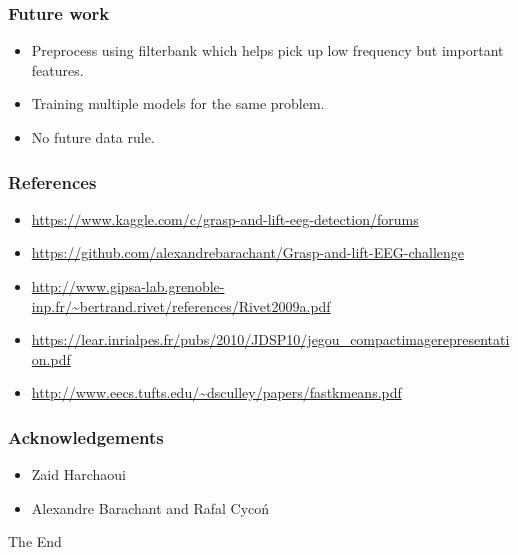 \documentclass{beamer}
\begin{document}
\begin{frame}
\frametitle{Future work}
\begin{itemize}
\item Preprocess using filterbank which helps pick up low frequency but important features.
\item Training multiple models for the same problem.
\item No future data rule.
\end{itemize}
\end{frame} 


\begin{frame}
\frametitle{References}
\begin{itemize}
\item \url{https://www.kaggle.com/c/grasp-and-lift-eeg-detection/forums}
\item \url{https://github.com/alexandrebarachant/Grasp-and-lift-EEG-challenge}
\item \url{http://www.gipsa-lab.grenoble-inp.fr/~bertrand.rivet/references/Rivet2009a.pdf}
\item \url{https://lear.inrialpes.fr/pubs/2010/JDSP10/jegou_compactimagerepresentation.pdf}
\item \url{http://www.eecs.tufts.edu/~dsculley/papers/fastkmeans.pdf}

\end{itemize}
\end{frame} 


\begin{frame}
\frametitle{Acknowledgements}
\begin{itemize}
\item Zaid Harchaoui
\item Alexandre Barachant and Rafal Cyco\'n
\end{itemize}
\end{frame} 

\begin{frame}
\Huge{\centerline{The End}}
\end{frame}
\end{document}
